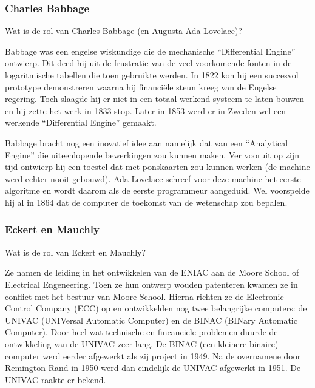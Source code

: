 \documentclass[../main.tex]{subfiles}
\begin{document}
\subsubsection{Charles Babbage}
\begin{question}
Wat is de rol van Charles Babbage (en Augusta Ada Lovelace)?
\end{question}
\begin{solution}
Babbage was een engelse wiskundige die de mechanische ``Differential Engine'' ontwierp.
Dit deed hij uit de frustratie van de veel voorkomende fouten in de logaritmische tabellen die toen gebruikte werden.
In 1822 kon hij een succesvol prototype demonstreren waarna hij financi\"ele steun kreeg van de Engelse regering.
Toch slaagde hij er niet in een totaal werkend systeem te laten bouwen en hij zette het werk in 1833 stop.
Later in 1853 werd er in Zweden wel een werkende ``Differential Engine'' gemaakt.

Babbage bracht nog een inovatief idee aan namelijk dat van een ``Analytical Engine'' die uiteenlopende bewerkingen zou kunnen maken.
Ver vooruit op zijn tijd ontwierp hij een toestel dat met ponskaarten zou kunnen werken (de machine werd echter nooit gebouwd).
Ada Lovelace schreef voor deze machine het eerste algoritme en wordt daarom als de eerste programmeur aangeduid.
Wel voorspelde hij al in 1864 dat de computer de toekomst van de wetenschap zou bepalen.


\end{solution}

\subsubsection{Eckert en Mauchly}
\begin{question}
Wat is de rol van Eckert en Mauchly?
\end{question}
\begin{solution}
Ze namen de leiding in het ontwikkelen van de ENIAC aan de Moore School of Electrical Engeneering.
Toen ze hun ontwerp wouden patenteren kwamen ze in conflict met het bestuur van Moore School.
Hierna richten ze de Electronic Control Company (ECC) op en ontwikkelden nog twee belangrijke computers: de UNIVAC (UNIVersal Automatic Computer) en de BINAC (BINary Automatic Computer).
Door heel wat technische en fincanciele problemen duurde de ontwikkeling van de UNIVAC zeer lang.
De BINAC (een kleinere binaire) computer werd eerder afgewerkt als zij project in 1949.
Na de overnamene door Remington Rand in 1950 werd dan eindelijk de UNIVAC afgewerkt in 1951.
De UNIVAC raakte er bekend.
\end{solution}
\end{document}
